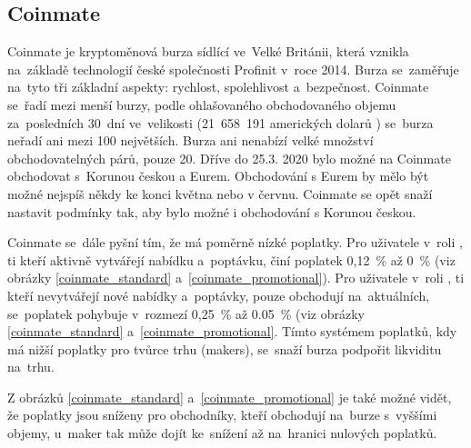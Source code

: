 \documentclass[thesis=B,czech]{FITthesis}[2019/03/21]
\begin{document}
\subsection{Coinmate}
Coinmate je kryptoměnová burza sídlící ve~Velké Británii, která vznikla \linebreak na~základě technologií české společnosti Profinit v~roce 2014. Burza se~zaměřuje na~tyto tři základní aspekty: rychlost, spolehlivost a~bezpečnost. Coinmate se~řadí mezi menší burzy, podle ohlašovaného obchodovaného objemu za~posledních 30~dní ve~velikosti (21~658~191 amerických dolarů \cite{coin360}) se~burza neřadí ani mezi 100 největších. \cite{coinmarketcap} Burza ani nenabízí velké množství obchodovatelných párů, pouze 20. Dříve do 25.3. 2020 bylo možné na Coinmate obchodovat s~Korunou českou a Eurem. Obchodování s Eurem by mělo být možné nejspíš někdy ke konci května nebo v červnu. Coinmate se opět snaží nastavit podmínky tak, aby bylo možné i obchodování s Korunou českou. \cite{coinmate_blog}  

Coinmate se~dále pyšní tím, že má poměrně nízké poplatky. Pro uživatele v~roli , ti kteří aktivně vytvářejí nabídku a~poptávku, činí poplatek 0,12~\% až 0~\% (viz obrázky \ref{coinmate_standard} a~\ref{coinmate_promotional}). Pro uživatele v~roli , ti kteří nevytvářejí nové nabídky a~poptávky, pouze obchodují na~aktuálních, se~poplatek pohybuje v~rozmezí 0,25~\% až 0.05~\% (viz obrázky \ref{coinmate_standard} a~\ref{coinmate_promotional}. Tímto systémem poplatků, kdy má nižší poplatky pro tvůrce trhu (makers), se~snaží burza podpořit likviditu na~trhu. \cite{cryptowisser_coinmate} \cite{coinmate_fees}

Z obrázků \ref{coinmate_standard} a~\ref{coinmate_promotional} je také možné vidět, že poplatky jsou sníženy pro obchodníky, kteří obchodují na~burze s~vyššími objemy, u~maker tak může dojít ke~snížení až na~hranici nulových poplatků. \cite{coinmate_fees}
\end{document}
